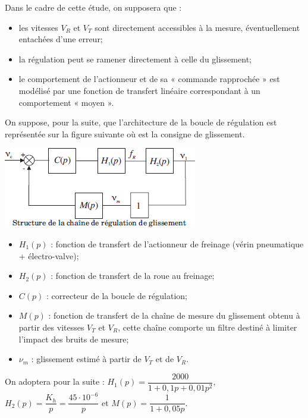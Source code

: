 \documentclass[10pt,fleqn]{article} %
\begin{document}
\begin{multicols}{2}
Dans le cadre de cette étude, on supposera que :
\begin{itemize}
\item les vitesses $V_R$ et $V_T$ sont directement accessibles à la mesure, éventuellement
entachées d’une erreur;
\item la régulation peut se ramener directement à celle du glissement;
\item  le comportement de l’actionneur et de sa « commande rapprochée » est modélisé
par une fonction de transfert linéaire correspondant à un comportement
« moyen ».
\end{itemize}
On suppose, pour la suite, que l’architecture de la boucle de régulation est représentée sur la figure suivante où est la consigne de glissement.

\begin{center}
\includegraphics[width=\linewidth]{images/fig_01}
\end{center}


\begin{itemize}
\item $H_1(p)$ : fonction de transfert de l’actionneur de freinage (vérin pneumatique
+ électro-valve);
\item $H_2(p)$ : fonction de transfert de la roue au freinage;
\item $C(p)$ : correcteur de la boucle de régulation;
\item $M(p)$ : fonction de transfert de la chaîne de mesure du glissement obtenu à
partir des vitesses $V_T$ et $V_R$, cette chaîne comporte un filtre destiné à limiter
l’impact des bruits de mesure;
\item $\nu_m$ : glissement estimé à partir de $V_T$ et de $V_R$.
\end{itemize}

On adoptera pour la suite : $H_1(p)=\dfrac{2000}{1+0,1p+0,01p^2}$,  $H_2(p)=\dfrac{K_h}{p} = \dfrac{45\cdot 10^{-6}}{p}$ et $M(p)=\dfrac{1}{1+0,05 p}$.


\end{multicols}
\end{document}
